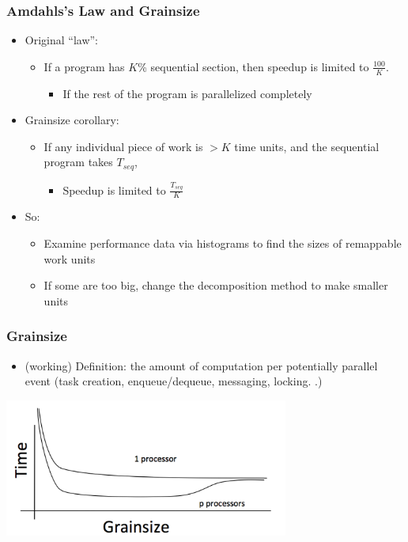 \documentclass{beamer}
\begin{document}
\begin{frame}
  \frametitle{Amdahls’s Law and Grainsize}
  \begin{itemize}
    \item Original ``law'':
      \begin{itemize}
      \item If a program has $K$\% sequential section, then speedup is limited
        to $\frac{100}{K}$.
        \begin{itemize}
        \item If the rest of the program is parallelized completely
        \end{itemize}
      \end{itemize}
    \item Grainsize corollary:
      \begin{itemize}
      \item If any individual piece of work is $> K$ time units, and the
        sequential program takes $T_{seq}$, 
        \begin{itemize}
        \item Speedup is limited to $\frac{T_{seq}}{K}$
        \end{itemize}
      \end{itemize}
    \item So:
      \begin{itemize}
      \item Examine performance data via histograms to find the sizes of
        remappable work units
      \item If some are too big, change the decomposition method to make
        smaller units
      \end{itemize}
  \end{itemize}
\end{frame}

\begin{frame}
  \frametitle{Grainsize}
  \begin{itemize}
    \item (working) Definition: the amount of computation per potentially
      parallel event (task creation, enqueue/dequeue, messaging, locking. .)
  \end{itemize}
  \begin{center} \includegraphics[width=0.7\textwidth]{grain1.png} \end{center}
\end{frame}
\end{document}
